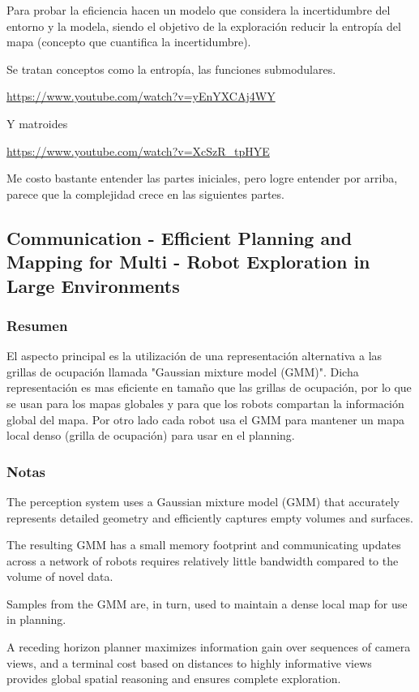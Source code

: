 Para probar la eficiencia hacen un modelo que considera la incertidumbre del entorno y la modela, siendo el objetivo de la exploración reducir la entropía del mapa (concepto que cuantifica la incertidumbre).

Se tratan conceptos como la entropía, las funciones submodulares.

\url{https://www.youtube.com/watch?v=yEnYXCAj4WY}

Y matroides

\url{https://www.youtube.com/watch?v=XcSzR_tpHYE}

Me costo bastante entender las partes iniciales, pero logre entender por arriba, parece que la complejidad crece en las siguientes partes.

\subsection{Communication - Efficient Planning and Mapping for Multi - Robot Exploration in Large Environments}
\subsubsection{Resumen}
El aspecto principal es la utilización de una representación alternativa a las grillas de ocupación llamada "Gaussian mixture model (GMM)". Dicha representación es mas eficiente en tamaño que las grillas de ocupación, por lo que se usan para los mapas globales y para que los robots compartan la información global del mapa. Por otro lado cada robot usa el GMM para mantener un mapa local denso (grilla de ocupación) para usar en el planning. 

\subsubsection{Notas}

The perception system uses a Gaussian mixture model (GMM) that accurately represents detailed geometry and efficiently captures empty volumes and surfaces. 

The resulting GMM has a small memory footprint and communicating updates across a network of robots requires relatively little bandwidth compared to the volume of novel data.

Samples from the GMM are, in turn, used to maintain a dense local map for use in planning.

A receding horizon planner maximizes information gain over sequences of camera views, and a terminal cost based on distances to highly informative views provides global spatial reasoning and ensures complete exploration.

